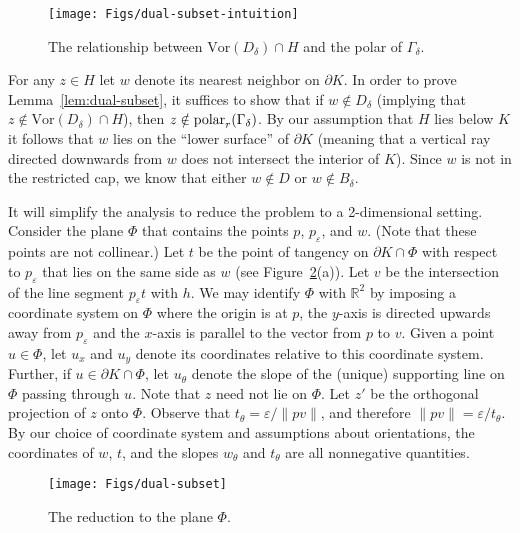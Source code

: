 \documentclass[11pt]{article}   \usepackage[letterpaper,hmargin=2.1cm,vmargin=3cm]{geometry}
\newcommand{\RE}{\mathbb{R}}    \newcommand{\ZZ}{\mathbb{Z}}    \newcommand{\eps}{\varepsilon}  \newcommand{\ST}{\,:\,}         \newcommand{\sq}{\square}
\newcommand{\Vor}{\mathrm{Vor}}
\begin{document}
\begin{figure}[htbp]
  \centerline{\texttt{[image: Figs/dual-subset-intuition]}}
  \caption{The relationship between $\Vor(D_{\delta}) \cap H$ and the polar of $\Gamma_{\delta}$.}
  \label{fig:dual-subset-intuition}
\end{figure}


For any $z \in H$ let $w$ denote its nearest neighbor on $\partial K$. In order to prove Lemma~\ref{lem:dual-subset}, it suffices to show that if $w \notin D_{\delta}$ (implying that $z \notin \Vor(D_{\delta}) \cap H$), then $z \notin \mathrm{polar}_{r}(\Gamma_{\delta})$. By our assumption that $H$ lies below $K$ it follows that $w$ lies on the ``lower surface'' of $\partial K$ (meaning that a vertical ray directed downwards from $w$ does not intersect the interior of $K$). Since $w$ is not in the restricted cap, we know that either $w \notin D$ or $w \notin B_{\delta}$.

It will simplify the analysis to reduce the problem to a 2-dimensional setting. Consider the plane $\Phi$ that contains the points $p$, $p_{\eps}$, and $w$. (Note that these points are not collinear.) Let $t$ be the point of tangency on $\partial K \cap \Phi$ with respect to $p_{\eps}$ that lies on the same side as $w$ (see Figure~\ref{fig:dual-subset}(a)). Let $v$ be the intersection of the line segment $p_{\eps} t$ with $h$. We may identify $\Phi$ with $\RE^2$ by imposing a coordinate system on $\Phi$ where the origin is at $p$, the $y$-axis is directed upwards away from $p_{\eps}$ and the $x$-axis is parallel to the vector from $p$ to $v$. Given a point $u \in \Phi$, let $u_x$ and $u_y$ denote its coordinates relative to this coordinate system. Further, if $u \in \partial K \cap \Phi$, let $u_{\theta}$ denote the slope of the (unique) supporting line on $\Phi$ passing through $u$. Note that $z$ need not lie on $\Phi$. Let $z'$ be the orthogonal projection of $z$ onto $\Phi$. Observe that $t_{\theta} = \eps/\|p v\|$, and therefore $\|p v\| = \eps/t_{\theta}$. By our choice of coordinate system and assumptions about orientations, the coordinates of $w$, $t$, and the slopes $w_{\theta}$ and $t_{\theta}$ are all nonnegative quantities. 

\begin{figure}[htbp]
  \centerline{\texttt{[image: Figs/dual-subset]}}
  \caption{The reduction to the plane $\Phi$.}
  \label{fig:dual-subset}
\end{figure}
\end{document}
